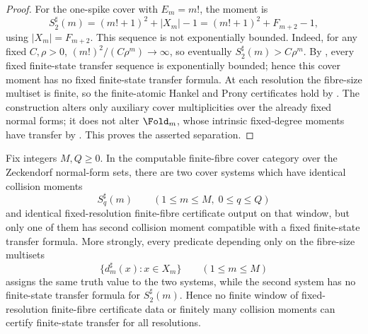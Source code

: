 \begin{proof}
For the one-spike cover with \(E_m=m!\), the moment is
\[
  S_2^\sharp(m)=(m!+1)^2+|X_m|-1=(m!+1)^2+F_{m+2}-1,
\]
using \(|X_m|=F_{m+2}\).  This sequence is not exponentially bounded.  Indeed,
for any fixed \(C,
\rho>0\), \((m!)^2/(C\rho^m)\to\infty\), so eventually
\(S_2^\sharp(m)>C\rho^m\).  By
, every fixed finite-state transfer
sequence is exponentially bounded; hence this cover moment has no fixed
finite-state transfer formula.  At each resolution the fibre-size multiset is
finite, so the finite-atomic Hankel and Prony certificates hold by
.  The construction alters only
auxiliary cover multiplicities over the already fixed normal forms; it does not
alter \(\Fold_m\), whose intrinsic fixed-degree moments have transfer by
.  This proves the asserted separation.
\end{proof}

\begin{theorem}
\label{thm:L2-finite-window-transfer-obstruction}
Fix integers \(M,Q\ge0\).  In the computable finite-fibre cover category over the
Zeckendorf normal-form sets, there are two cover systems which have identical
collision moments
\[
  S_q^\sharp(m)
  \qquad(1\le m\le M,\;0\le q\le Q)
\]
and identical fixed-resolution finite-fibre certificate output on that window,
but only one of them has second collision moment compatible with a fixed
finite-state transfer formula.  More strongly, every predicate depending only on
the fibre-size multisets
\[
  \{d_m^\sharp(x):x\in X_m\}\qquad(1\le m\le M)
\]
assigns the same truth value to the two systems, while the second system has no
finite-state transfer formula for \(S_2^\sharp(m)\).  Hence no finite window of
fixed-resolution finite-fibre certificate data or finitely many collision
moments can certify finite-state transfer for all resolutions.
\end{theorem}

